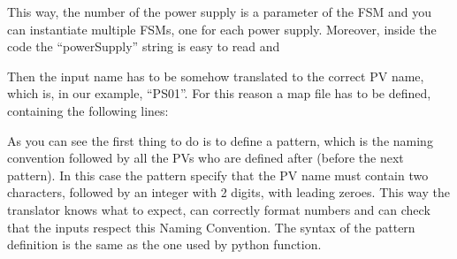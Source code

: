 \documentclass[letterpaper,10pt,english]{sphinxmanual}
\begin{document}
%
\begin{sphinxVerbatim}[commandchars=\\\{\}]
 
         
          

           
\end{sphinxVerbatim}

This way, the number of the power supply is a parameter of the FSM and you can
instantiate multiple FSMs, one for each power supply. Moreover, inside the code
the “powerSupply” string is easy to read and

Then the input name has to be somehow translated to the correct PV name, which
is, in our example, “PS01”. For this reason a map file has to be defined,
containing the following lines:

%
\begin{sphinxVerbatim}[commandchars=\\\{\}]
     
         
\end{sphinxVerbatim}

As you can see the first thing to do is to define a pattern, which is the naming
convention followed by all the PVs who are defined after (before the next
pattern). In this case the pattern specify that the PV name must contain two
characters, followed by an integer with 2 digits, with leading zeroes. This way
the translator knows what to expect, can correctly format numbers and can check
that the inputs respect this Naming Convention. The syntax of the pattern
definition is the same as the one used by python  function.
\end{document}
